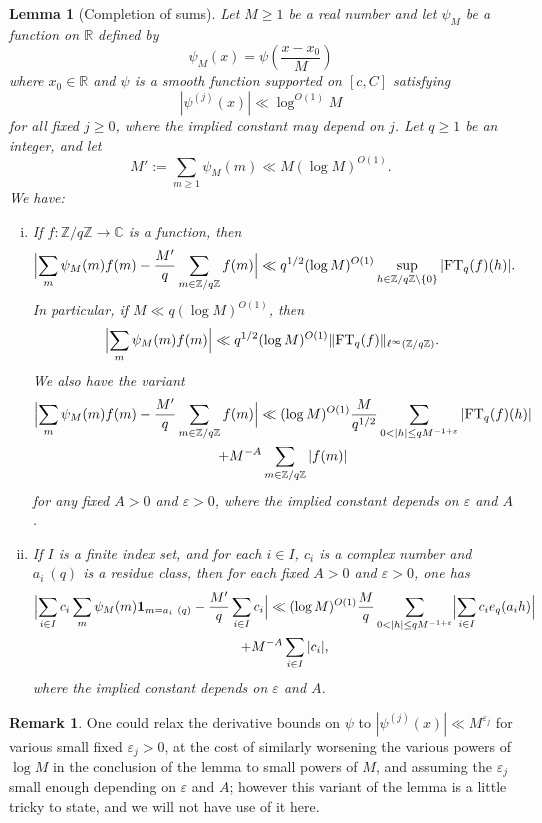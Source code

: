 \documentclass[12pt,a4paper,reqno]{amsart}
\numberwithin{equation}{section}
\newcommand{\FT}{\mathrm{FT}}
\theoremstyle{plain}
\newtheorem{lemma}[theorem]{Lemma}
\theoremstyle{definition}
\newtheorem{remark}[theorem]{Remark}
\newcommand\R{\mathbb{R}}
\newcommand\Z{\mathbb{Z}}
\newcommand\C{\mathbb{C}}
\newcommand\eps{\varepsilon}
\newcommand{\onef}{\mathbf{1}}
\begin{document}
\begin{lemma}[Completion of sums]\label{com} 
  Let $M\geq 1$ be a real number and let $\psi_M$ be a function on
  $\R$ defined by
$$
\psi_M(x) = \psi\left(\frac{x-x_0}{M}\right)
$$
where $x_0\in \R$ and $\psi$ is a smooth function supported on $[c,C]$
satisfying 
$$
|\psi^{(j)}(x)| \ll \log^{O(1)} M
$$
for all fixed $j \geq 0$, where the implied constant may depend on
$j$.  Let $q\geq 1$ be an integer, and let
$$
M' := \sum_{m\geq 1}\psi_M(m)\ll M(\log M)^{O(1)}.
$$
We have:
\begin{enumerate}[(i)]
\item If $f\colon \Z/q\Z \to \C$ is a function, then
\begin{equation}\label{complete-1}
  \Bigl|\sum_m \psi_M(m) f(m) - \frac{M'}{q} 
  \sum_{m \in \Z/q\Z} f(m)\Bigr| 
  \ll  q^{1/2}(\log M)^{O(1)}\sup_{h \in \Z/q\Z \backslash \{0\}}|\FT_q(f)(h)|.
\end{equation}
In particular, if $M \ll q(\log M)^{O(1)}$, then
\begin{equation}\label{complete-2}
  \Bigl|\sum_m \psi_M(m) f(m)\Bigr| \ll q^{1/2}(\log M)^{O(1)} \|\FT_q(f)\|_{\ell^\infty(\Z/q\Z)}.
\end{equation}
We also have the variant
\begin{multline}\label{complete-1b}
  \Bigl|\sum_m \psi_M(m) f(m) - \frac{M'}{q} \sum_{m \in \Z/q\Z}
  f(m)\Bigr| \ll (\log M)^{O(1)} \frac{M}{q^{1/2}} \sum_{0 < |h|\leq
    qM^{-1+\eps}} |\FT_q(f)(h)|
  \\
  + M^{-A} \sum_{m \in \Z/q\Z} |f(m)|
\end{multline}
for any fixed $A>0$ and $\eps>0$, where the implied constant depends
on $\eps$ and $A$.
\item If $I$ is a finite index set, and for each $i \in I$, $c_i$ is a
  complex number and $a_i\ (q)$ is a residue class, then for each
  fixed $A>0$ and $\eps>0$, one has
\begin{multline}\label{complete-3}
  \Bigl|\sum_{i \in I} c_i \sum_m \psi_M(m) \onef_{m=a_i\ (q)} -
  \frac{M'}{q} \sum_{i \in I} c_i\Bigr| \ll (\log M)^{O(1)}\frac{M}{q}
  \sum_{0 < |h|\leq  qM^{-1+\eps}} \Bigl|\sum_{i \in I} c_i e_q(a_i h)\Bigr| \\
  + M^{-A} \sum_{i \in I} |c_i|,
\end{multline}
where the implied constant depends on $\eps$ and $A$.
\end{enumerate}
\end{lemma}

\begin{remark} One could relax the derivative bounds on $\psi$ to $|\psi^{(j)}(x)| \ll M^{\eps_j}$ for various small fixed $\eps_j>0$, at the cost of similarly worsening the various powers of $\log M$ in the conclusion of the lemma to small powers of $M$, and assuming the $\eps_j$ small enough depending on $\eps$ and $A$; however this variant of the lemma is a little tricky to state, and we will not have use of it here.
\end{remark}
\end{document}
